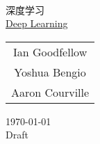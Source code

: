 
\begin{titlepage}
\begin{center}
  \hfill\\
  \vspace{1cm}
  {\fontsize{36pt}{40pt}\NotoSansSCBold{} 深度学习}\\
  \vspace{1em}
  {\LARGE\serif \href{http://www.deeplearningbook.org/}{Deep Learning}}\\
  \vspace{1cm}
  \vspace{1cm}
  
  {\large\serif
  \begin{tabular}{c}
    Ian Goodfellow \\
    Yoshua Bengio \\
    Aaron Courville
  \end{tabular}
  }
   
  \vfill
  {\large \today}\\
  \vspace{1em}
  {\large Draft}
\end{center}
\end{titlepage}
